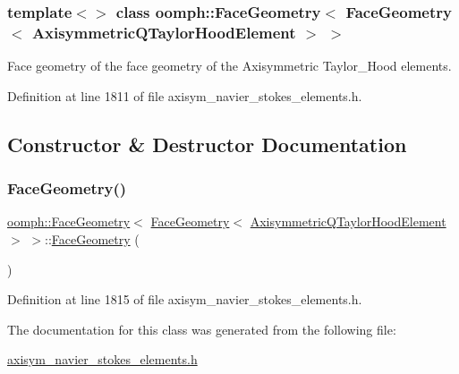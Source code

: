 \subsubsection*{template$<$$>$\newline
class oomph\+::\+Face\+Geometry$<$ Face\+Geometry$<$ Axisymmetric\+Q\+Taylor\+Hood\+Element $>$ $>$}

Face geometry of the face geometry of the Axisymmetric Taylor\+\_\+\+Hood elements. 

Definition at line 1811 of file axisym\+\_\+navier\+\_\+stokes\+\_\+elements.\+h.



\subsection{Constructor \& Destructor Documentation}
\mbox{\label{classoomph_1_1FaceGeometry_3_01FaceGeometry_3_01AxisymmetricQTaylorHoodElement_01_4_01_4_a7a02abe6f5ed3c814445b924e29f1cd2}} 
\subsubsection{\texorpdfstring{Face\+Geometry()}{FaceGeometry()}}
{\footnotesize\ttfamily \hyperlink{classoomph_1_1FaceGeometry}{oomph\+::\+Face\+Geometry}$<$ \hyperlink{classoomph_1_1FaceGeometry}{Face\+Geometry}$<$ \hyperlink{classoomph_1_1AxisymmetricQTaylorHoodElement}{Axisymmetric\+Q\+Taylor\+Hood\+Element} $>$ $>$\+::\hyperlink{classoomph_1_1FaceGeometry}{Face\+Geometry} (\begin{DoxyParamCaption}{ }\end{DoxyParamCaption})\hspace{0.3cm}{\ttfamily [inline]}}



Definition at line 1815 of file axisym\+\_\+navier\+\_\+stokes\+\_\+elements.\+h.



The documentation for this class was generated from the following file\+:\begin{DoxyCompactItemize}
\item 
\hyperlink{axisym__navier__stokes__elements_8h}{axisym\+\_\+navier\+\_\+stokes\+\_\+elements.\+h}\end{DoxyCompactItemize}
